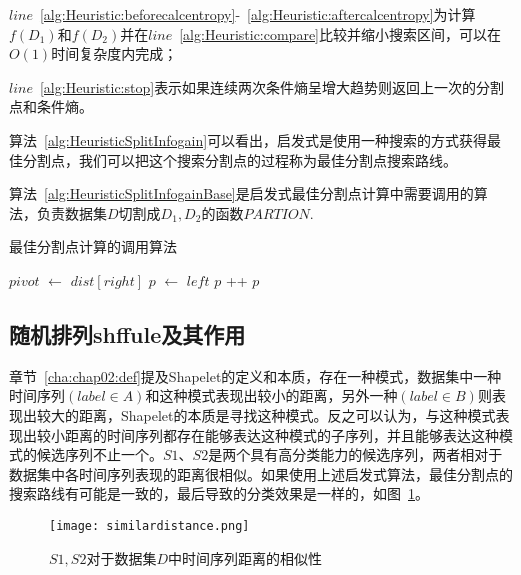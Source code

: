 $line$~\ref{alg:Heuristic:beforecalcentropy}-~\ref{alg:Heuristic:aftercalcentropy}为计算$f(D_1)$和$f(D_2)$并在$line$~\ref{alg:Heuristic:compare}比较并缩小搜索区间，可以在$O(1)$时间复杂度内完成；

$line$~\ref{alg:Heuristic:stop}表示如果连续两次条件熵呈增大趋势则返回上一次的分割点和条件熵。

算法~\ref{alg:HeuristicSplitInfogain}可以看出，启发式是使用一种搜索的方式获得最佳分割点，我们可以把这个搜索分割点的过程称为最佳分割点搜索路线。

算法~\ref{alg:HeuristicSplitInfogainBase}是启发式最佳分割点计算中需要调用的算法，负责数据集$D$切割成$D_1,D_2$的函数$PARTION$.%
\begin{algorithm}
	\caption{最佳分割点计算的调用算法}
	\label{alg:HeuristicSplitInfogainBase}
	\begin{algorithmic}[1]
			\State $pivot$ $\gets$ $dist[right]$
			\State $p$ $\gets$ $left$
					\State {}
					\State {}
					\State $p$ ++
				\EndIf
			\EndFor
			\State {}
			\State \Return $p$
		\EndFunction
	\end{algorithmic}
\end{algorithm}

\subsection{随机排列shffule及其作用}
\label{cha:chap04:myalg:infogain:shuffle}

章节~\ref{cha:chap02:def}提及Shapelet的定义和本质，存在一种模式，数据集中一种时间序列$(label \in A)$和这种模式表现出较小的距离，另外一种$(label \in B)$则表现出较大的距离，Shapelet的本质是寻找这种模式。反之可以认为，与这种模式表现出较小距离的时间序列都存在能够表达这种模式的子序列，并且能够表达这种模式的候选序列不止一个。$S1$、$S2$是两个具有高分类能力的候选序列，两者相对于数据集中各时间序列表现的距离很相似。如果使用上述启发式算法，最佳分割点的搜索路线有可能是一致的，最后导致的分类效果是一样的，如图~\ref{fig:similardistance}。

\begin{figure}[H] %
	\centering
	\texttt{[image: similardistance.png]}
	\caption{$S1,S2$对于数据集$D$中时间序列距离的相似性}
	\label{fig:similardistance}
\end{figure}

